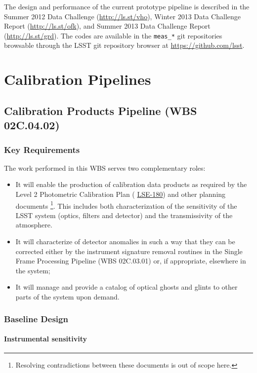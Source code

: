 \documentclass[12pt]{article}
\newcommand{\ds}[2]{{\color{blue} \href{https://docushare.lsstcorp.org/docushare/dsweb/Get/#1}{#2}}\xspace}
\newcommand{\NewPCP}{\ds{LSE-180}{LSE-180}}
\newcommand{\wbsSFM}{WBS 02C.03.01}
\newcommand{\wbsCPP}{WBS 02C.04.02}
\begin{document}
The design and performance of the current prototype pipeline is described in the Summer 2012 Data Challenge (\url{http://ls.st/vho}), Winter 2013 Data Challenge Report (\url{http://ls.st/ofk}), and Summer 2013 Data Challenge Report (\url{http://ls.st/grd}). The codes are available in the {\tt meas\_*} git repositories browsable through the LSST git repository browser at \url{https://github.com/lsst}.

\clearpage

\section{Calibration Pipelines}

\subsection{Calibration Products Pipeline (\wbsCPP)}

\subsubsection{Key Requirements}

The work performed in this WBS serves two complementary roles:

\begin{itemize}
  \item{It will enable the production of calibration data products as required by the Level 2 Photometric Calibration Plan (\NewPCP{}) and other planning documents \cite{Lupton15}\footnote{Resolving contradictions between these documents is out of scope here.}. This includes both characterization of the sensitivity of the LSST system (optics, filters and detector) and the transmissivity of the atmosphere.}
  \item{It will characterize of detector anomalies in such a way that they can be corrected either by the instrument signature removal routines in the Single Frame Processing Pipeline (\wbsSFM) or, if appropriate, elsewhere in the system;}
  \item{It will manage and provide a catalog of optical ghosts and glints to other parts of the system upon demand.}
\end{itemize}

\subsubsection{Baseline Design}

\paragraph{Instrumental sensitivity}
\end{document}
